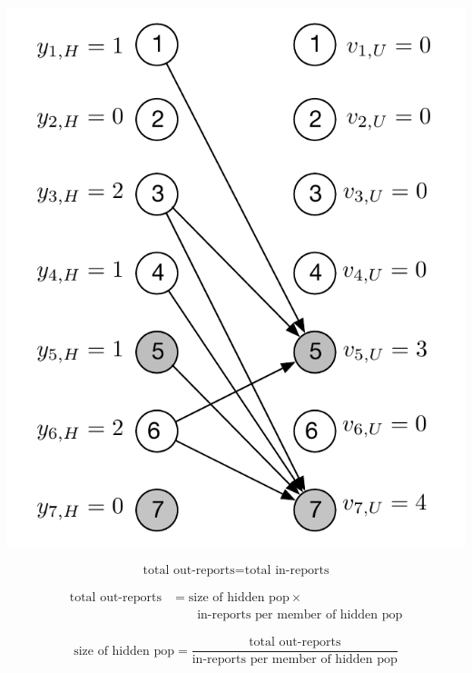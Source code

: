 \documentclass[aspectratio=169]{beamer}
\begin{document}
\begin{frame}

\begin{center}
\includegraphics[height=0.8\textheight]{figures/reporting-network-panel2}
\end{center}

\end{frame}
\begin{frame}

\begin{equation*}
\mbox{total out-reports} = \mbox{total in-reports}
\end{equation*}

\pause

\begin{align}
\mbox{total out-reports} & = \mbox{size of hidden pop}  \times  \nonumber \\ & \qquad \mbox{in-reports per member of hidden pop}  \nonumber
\end{align}

\pause 

\begin{equation*}
\mbox{size of hidden pop} = \frac{ \mbox{total out-reports} } { \mbox{in-reports per member of hidden pop} }
\end{equation*}

\end{frame}
\end{document}
